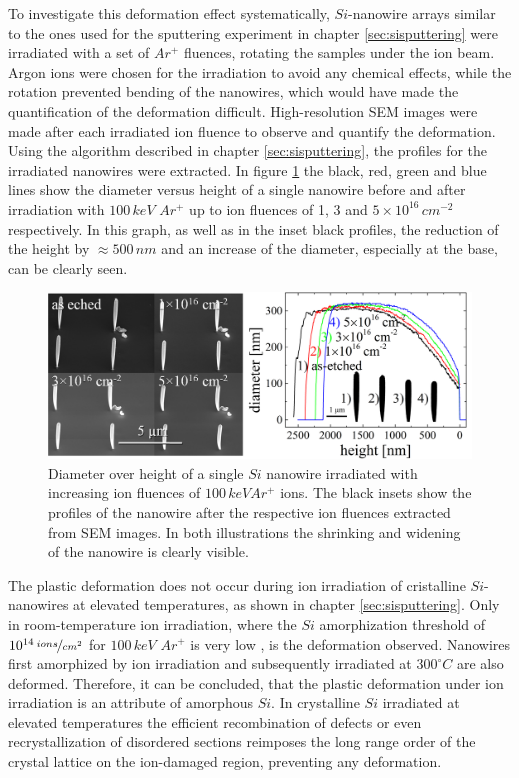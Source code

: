 To investigate this deformation effect systematically, $Si$-nanowire arrays similar to the ones used for the sputtering experiment in chapter \ref{sec:sisputtering} were irradiated with a set of $Ar^+$ fluences, rotating the samples under the ion beam. Argon ions were chosen for the irradiation to avoid any chemical effects, while the rotation prevented bending of the nanowires, which would have made the quantification of the deformation difficult.  High-resolution SEM images were made after each irradiated ion fluence to observe and quantify the deformation. Using the algorithm described in chapter \ref{sec:sisputtering}, the profiles for the irradiated nanowires were extracted. In figure \ref{deformationprofile} the black, red, green and blue lines show the diameter versus height of a single nanowire before and after irradiation with $100\,keV\,\,Ar^+$ up to ion fluences of 1, 3 and $5 \times 10^{16}\,cm^{-2}$ respectively. In this graph, as well as in the inset black profiles, the reduction of the height by $\approx 500\,nm$ and an increase of the diameter, especially at the base, can be clearly seen. 


\begin{figure}[thbp]
	\centering
		\includegraphics[width=.8\textwidth]{images/deformationprofileandSEM.jpg}
		\caption{Diameter over height of a single $Si$ nanowire irradiated with increasing ion fluences of $100\,keV Ar^+$ ions. The black insets show the profiles of the nanowire after the respective ion fluences extracted from SEM images. In both illustrations the shrinking and widening of the nanowire is clearly visible.} 
	\label{deformationprofile} 
\end{figure}

The plastic deformation does not occur during ion irradiation of cristalline $Si$-nanowires at elevated temperatures, as shown in chapter \ref{sec:sisputtering}. Only in room-temperature ion irradiation, where the $Si$ amorphization threshold of $10^{14}\,\nicefrac{ions}{cm^2}$ for $100\,keV\,\,Ar^+$ is very low \cite{pelaz_ion-beam-induced_2004}, is the deformation observed. Nanowires first amorphized by ion irradiation and subsequently irradiated at $300^\circ C$ are also deformed. Therefore, it can be concluded, that the plastic deformation under ion irradiation is an attribute of amorphous $Si$. In crystalline $Si$ irradiated at elevated temperatures the efficient recombination of defects or even recrystallization of disordered sections reimposes the long range order of the crystal lattice on the ion-damaged region, preventing any deformation.



